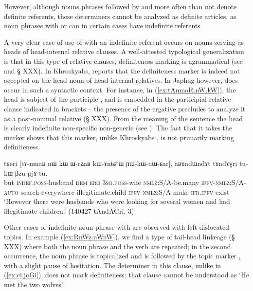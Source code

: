 However, although nouns phrases followed by  and  more often than not denote definite referents, these determiners cannot be analyzed as definite articles, as noun phrases with  or  can in certain cases have indefinite referents. 

A very clear case of use of  with an indefinite referent occurs on nouns serving as heads of head-internal relative clauses. A well-attested typological generalization is that in this type of relative clauses, definiteness marking is agrammatical (see \citealt{basilico96internally} and § XXX). In Khroskyabs, \citet[636]{lai17khroskyabs} reports that the definiteness marker  is indeed not accepted on the head noun of head-internal relatives. In Japhug however,  does occur in such a syntactic context. For instance, in (\ref{ex:tAnmaR.nW.kW}), the head  is subject of the participle , and is embedded in the participial relative clause indicated in brackets -- the presence of the ergative  precludes to analyze it as a post-nominal relative (§ XXX). From the meaning of the sentence the head  is clearly indefinite non-specific non-generic  (see \citealt[286-291]{lehmann84relativsatz}). The fact that it takes the marker  shows that this marker, unlike Khroskyabs , is not primarily marking definiteness.

\begin{exe}
\ex \label{ex:tAnmaR.nW.kW}
 \gll tɕeri [tɤ-nmaʁ nɯ kɯ ɯ-rʑaʁ kɯ-ɤntɕʰɯ ɲɯ-kɯ-nɯ-ɕar], aʁɤndɯndɤt tɤndɤɣri tu-kɯ-βzu pjɤ-tu.  \\
but  \textsc{indef}.\textsc{poss}-husband \textsc{dem} \textsc{erg} \textsc{3sg}.\textsc{poss}-wife  \textsc{nmlz}:S/A-be.many \textsc{ipfv}-\textsc{nmlz}:S/A-\textsc{auto}-search everywhere  illegitimate.child  \textsc{ipfv}-\textsc{nmlz}:S/A-make \textsc{ifr}.\textsc{ipfv}-exist \\
\glt `However there were husbands who were looking for several women and had illegitimate children.' (140427 tAndAGri, 3)
\end{exe}

Other cases of indefinite noun phrase with  are observed with left-dislocated topics. In example (\ref{ex:RnWz.nWnW}), we find a type of tail-head linkeage  (§ XXX) where both the noun phrase  and the verb  are repeated; in the second occurrence, the noun phrase is topicalized and is followed by the topic marker , with a slight pause of hesitation. The determiner  in this clause, unlike  in (\ref{ex:ci.joGi}), does not mark definiteness: that clause cannot be understood as `He met the two wolves'.

